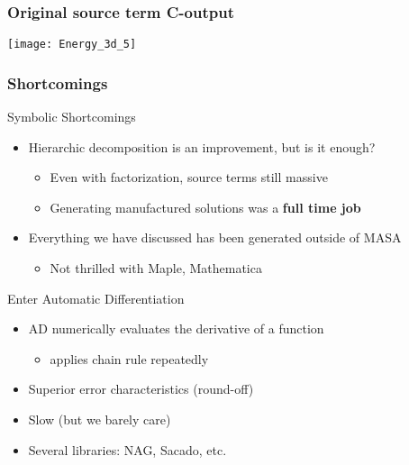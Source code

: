 \documentclass[mathserif]{beamer}
\begin{document}

\begin{frame}
  \frametitle{Original source term C-output}
  \vspace{-15pt}
  \hspace{-1cm}\quad
  \texttt{[image: Energy\_3d\_5]}
\end{frame}

\begin{frame}
\frametitle{Shortcomings}

\begin{block}{Symbolic Shortcomings}
 \begin{itemize}
  \item Hierarchic decomposition is an improvement, but is it enough?
	\begin{itemize}	 
	 \item Even with factorization, source terms still massive
	 \item Generating manufactured solutions was a {\bf full time job}
	\end{itemize}
  \item Everything we have discussed has been generated outside of MASA
	\begin{itemize}
	 \item Not thrilled with Maple, Mathematica
	\end{itemize}
 \end{itemize}
\end{block}

\begin{block}{Enter Automatic Differentiation}
 \begin{itemize}
  \item AD numerically evaluates the derivative of a function 
	\begin{itemize}
	 \item applies chain rule repeatedly 
	\end{itemize}
  \item Superior error characteristics (round-off)
  \item Slow (but we barely care)
  \item Several libraries: NAG, Sacado, etc.
 \end{itemize}
\end{block}
\end{frame}
\end{document}
